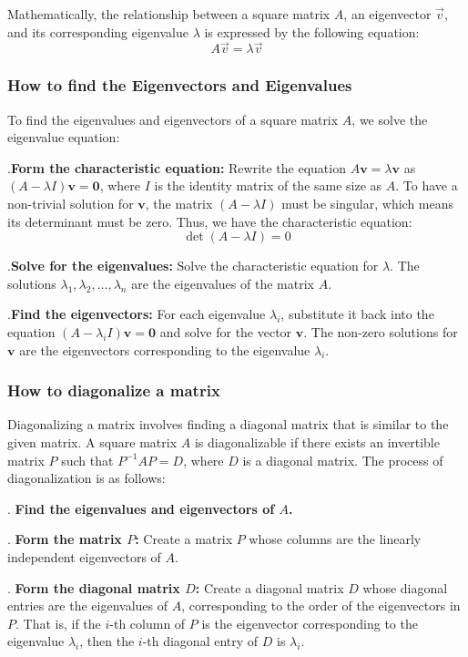 Mathematically, the relationship between a square matrix $A$, an eigenvector $\vec{v}$, and its corresponding eigenvalue $\lambda$ is expressed by the following equation:
\[
A\vec{v} = \lambda\vec{v}
\]

\subsubsection{How to find the Eigenvectors and Eigenvalues}

To find the eigenvalues and eigenvectors of a square matrix $A$, we solve the eigenvalue equation:

.\textbf{Form the characteristic equation:}
    Rewrite the equation $A\mathbf{v} = \lambda\mathbf{v}$ as $(A - \lambda I)\mathbf{v} = \mathbf{0}$, where $I$ is the identity matrix of the same size as $A$. To have a non-trivial solution for $\mathbf{v}$, the matrix $(A - \lambda I)$ must be singular, which means its determinant must be zero. Thus, we have the characteristic equation:
    \[
    \det(A - \lambda I) = 0
    \]

.\textbf{Solve for the eigenvalues:}
    Solve the characteristic equation for $\lambda$. The solutions $\lambda_1, \lambda_2, \dots, \lambda_n$ are the eigenvalues of the matrix $A$.

.\textbf{Find the eigenvectors:}
    For each eigenvalue $\lambda_i$, substitute it back into the equation $(A - \lambda_i I)\mathbf{v} = \mathbf{0}$ and solve for the vector $\mathbf{v}$. The non-zero solutions for $\mathbf{v}$ are the eigenvectors corresponding to the eigenvalue $\lambda_i$.

\subsubsection{How to diagonalize a matrix}

Diagonalizing a matrix involves finding a diagonal matrix that is similar to the given matrix. A square matrix $A$ is diagonalizable if there exists an invertible matrix $P$ such that $P^{-1}AP = D$, where $D$ is a diagonal matrix.
The process of diagonalization is as follows:

.  \textbf{Find the eigenvalues and eigenvectors of $A$.\/}

.  \textbf{Form the matrix $P$:}
    Create a matrix $P$ whose columns are the linearly independent eigenvectors of $A$.

    .  \textbf{Form the diagonal matrix $D$:}
    Create a diagonal matrix $D$ whose diagonal entries are the eigenvalues of $A$, corresponding to the order of the eigenvectors in $P$. That is, if the $i$-th column of $P$ is the eigenvector corresponding to the eigenvalue $\lambda_i$, then the $i$-th diagonal entry of $D$ is $\lambda_i$.

